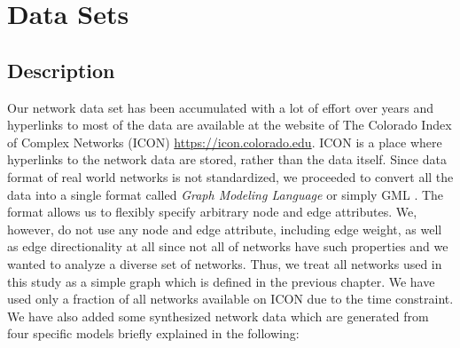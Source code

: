 \documentclass{article}
\begin{document}
\newpage
\section{Data Sets}
	\subsection{Description}	
	Our network data set has been accumulated with a lot of effort over years and hyperlinks to most of the data are available at the website of The Colorado Index of Complex Networks (ICON) \url{https://icon.colorado.edu}. ICON is a place where hyperlinks to the network data are stored, rather than the data itself.  
	Since data format of real world networks is not standardized, we proceeded to convert all the data into a single format called \textit{Graph Modeling Language} or simply GML \cite{GML}. The format allows us to flexibly specify arbitrary node and edge attributes. We, however, do not use any node and edge attribute, including edge weight, as well as edge directionality at all since not all of networks have such properties and we wanted to analyze a diverse set of networks. Thus, we treat all networks used in this study as a simple graph which is defined in the previous chapter. We have used only a fraction of all networks available on ICON due to the time constraint. We have also added some synthesized network data which are generated from four specific models briefly explained in the following:
	 
\end{document}
